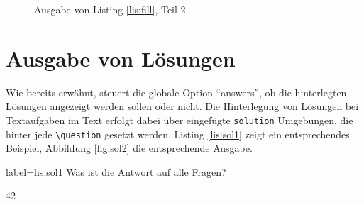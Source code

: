 \begin{figure}
\caption{Ausgabe von Listing \ref{lis:fill}, Teil 2}\label{fig:fill2}
\end{figure}

\section{Ausgabe von Lösungen}

Wie bereits erwähnt, steuert die globale Option \enquote{answers}, ob die hinterlegten Lösungen angezeigt werden sollen oder nicht. 
Die Hinterlegung von Lösungen bei Textaufgaben im Text erfolgt dabei über eingefügte \texttt{solution} Umgebungen, die hinter jede \texttt{\textbackslash question} gesetzt werden.
Listing \ref{lis:sol1} zeigt ein entsprechendes Beispiel, Abbildung \ref{fig:sol2} die entsprechende Ausgabe.

\begin{lfgwcode}{label={lis:sol1}}
\question Was ist die Antwort auf alle Fragen?

\begin{solution}
42
\end{solution}
\end{lfgwcode}


